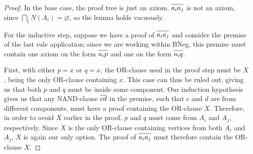 \begin{proof}
  In the base case, the proof tree is just an axiom.
  $\ol{a_ia_j}$ is not an axiom, since $\bigcap_i N(A_i) = \varnothing$, so the lemma holds vacuously.

  For the inductive step, suppose we have a proof of $\ol{a_ia_j}$ and consider the premise of the last rule application;
  since we are working within BNeg, this premise must contain one axiom on the form $\ol{a_ip}$ and one on the form $\ol{a_iq}$.\par
  \begin{figure}[!h]
    \centering
    \begin{prooftree*}
      \Hypo{\dots}
      \Hypo{\dots}
      \Hypo{\dots}
    \end{prooftree*}
    \caption{}
    \label{fig:ab_proof_bc}
  \end{figure}
  \FloatBarrier
  First, with either $p = x$ or $q = x$, the OR-clause used in the proof step must be $X$, being the only OR-clause containing $x$.
  This case can thus be ruled out, giving us that both $p$ and $q$ must be inside some component.
  Our induction hypothesis gives us that any NAND-clause $\ol{cd}$ in the premise, such that $c$ and $d$ are from different components, must have a proof containing the OR-clause $X$.
  Therefore, in order to avoid $X$ earlier in the proof, $p$ and $q$ must come from $A_i$ and $A_j$, respectively.
  Since $X$ is the only OR-clause containing vertices from both $A_i$ and $A_j$, $X$ is again our only option.
  The proof of $\ol{a_ia_j}$ must therefore contain the OR-clause $X$.
\end{proof}
